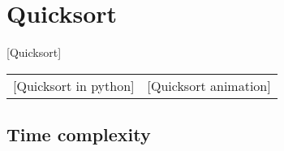 \documentclass{article}
\begin{document}
	\newpage
	\section{Quicksort}
		[Quicksort]

		\begin{tabular}{cc}
			\begin{minipage}{0.5\textwidth}
				{quickSort}[Quicksort in python]
			\end{minipage}
			&
			\begin{minipage}{0.5\textwidth}
				\myHref{https://upload.wikimedia.org/wikipedia/commons/6/6a/Sorting_quicksort_anim.gif}[Quicksort animation]
			\end{minipage}
		\end{tabular}

		\subsection{Time complexity}
			\def \timeComplexWorstCase {
				\parbox{0.4\textwidth}{
					\begin{equation*}
					\begin{split}
						& T(n) = O(n) + T(0) + T(n - 1) = O(n) + T(n - 1)\\
						& T(n) = T(n - 1) + n\\
						& (x - 1)(x - 1)^2 = 0\\
						& r_1 = 1; \ r_2 = 1; \ r_3 = 1;\\
						& t_n = C_1 \cdot 1^n + C_2 \cdot n \cdot 1^n + C_3 \cdot n^2 \cdot 1^n\\
						& T(n) = O(n^2)\\
					\end{split}
					\end{equation*}
				}
			}

			\def \timeComplexBestCase {
				\parbox{0.4\textwidth}{
					\begin{equation*}
					\begin{split}
						& T(n) = O(n) + 2T \Big( \frac{n}{2} \Big)\\
						& n = 2^a; \ a = \log_2 {n}\\
						& T(2^a) = 2T(2^{a - 1}) + O(2^a)\\
						& ...\\
						& T(n) = O(n\log_2 {n})
					\end{split}
					\end{equation*}
				}
			}
\end{document}
